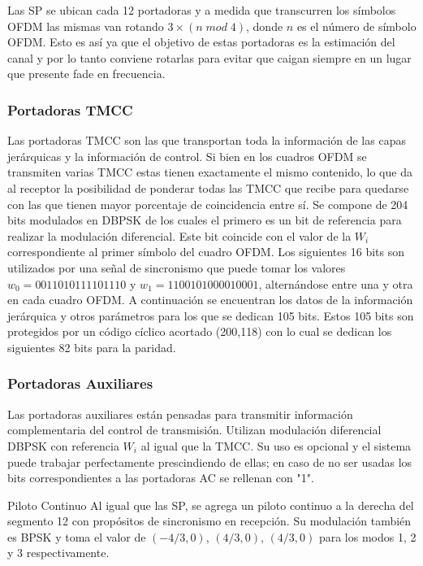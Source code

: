 Las SP se ubican cada 12 portadoras y a medida que transcurren los símbolos OFDM las mismas van rotando $3 \times (n \; mod \; 4)$, donde $n$ es el número de símbolo OFDM. Esto es así ya que el objetivo de estas portadoras es la estimación del canal y por lo tanto conviene rotarlas para evitar que caigan siempre en un lugar que presente fade en frecuencia.



\subsubsection{Portadoras TMCC}

Las portadoras TMCC son las que transportan toda la información de las capas jerárquicas y la información de control. Si bien en los cuadros OFDM se transmiten varias TMCC estas tienen exactamente el mismo contenido, lo que da al receptor la posibilidad de ponderar todas las TMCC que recibe para quedarse con las que tienen mayor porcentaje de coincidencia entre sí.
Se compone de 204 bits modulados en DBPSK de los cuales el primero es un bit de referencia para realizar la modulación diferencial. Este bit coincide con el valor de la $W_i$ correspondiente al primer símbolo del cuadro OFDM.
Los siguientes 16 bits son utilizados por una señal de sincronismo que puede tomar los valores $w_0 = 0011010111101110$ y $w_1 = 1100101000010001$, alternándose entre una y otra en cada cuadro OFDM.
A continuación se encuentran los datos de la información jerárquica y otros parámetros para los que se dedican 105 bits. Estos 105 bits son protegidos por un código cíclico acortado (200,118) con lo cual se dedican los siguientes 82 bits para la paridad. 
  
\subsubsection{Portadoras Auxiliares}

Las portadoras auxiliares están pensadas para transmitir información complementaria del control de transmisión. Utilizan modulación diferencial DBPSK con referencia $W_i$ al igual que la TMCC. Su uso es opcional y el sistema puede trabajar perfectamente prescindiendo de ellas; en caso de no ser usadas los bits correspondientes a las portadoras AC se rellenan con "1".

Piloto Continuo
Al igual que las SP, se agrega un piloto continuo a la derecha del segmento 12 con propósitos de sincronismo en recepción. Su modulación también es BPSK y toma el valor de $(-4/3, 0)$, $(4/3, 0)$, $(4/3, 0)$ para los modos 1, 2 y 3 respectivamente.






